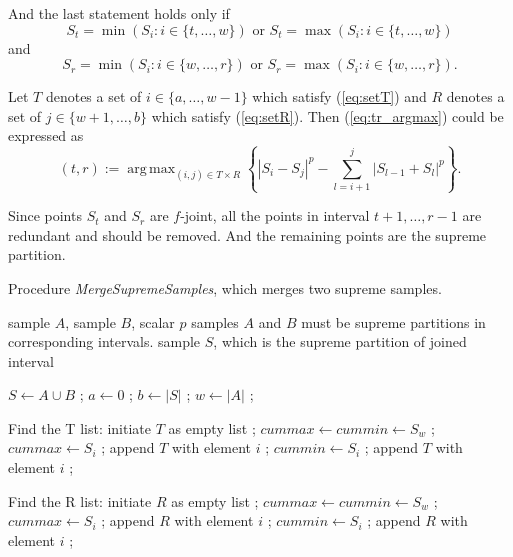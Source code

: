 \documentclass[12pt, a4paper]{article}
\DeclareMathOperator*{\argmax}{arg\,max}
\numberwithin{equation}{section}
\begin{document}
And the last statement holds only if 
\begin{equation}\label{eq:setT}
  S_t =  \min ( S_i : i \in \{t, \dots, w\}) 
    \text{ or } S_t =  \max ( S_i : i \in \{t, \dots, w\})
\end{equation}
and
\begin{equation}\label{eq:setR}
  S_r =  \min ( S_i : i \in \{w, \dots, r\}) 
    \text{ or } S_r = \max ( S_i : i \in \{w, \dots, r\}).
\end{equation} 


Let $T$ denotes a set of $i \in \{a,\dots ,w-1\}$ which satisfy 
(\ref{eq:setT}) and $R$ denotes a set of 
$j \in \{w+1,\dots ,b\}$ which satisfy (\ref{eq:setR}).
Then (\ref{eq:tr_argmax}) 
could be expressed as
\begin{equation}
  (t, r) :=  
    \argmax_{(i,j) \in T \times R }  
    \left\{|S_i-S_j|^p - \sum_{l=i+1}^j |S_{l-1} + S_{l}|^p  \right\}.   
\end{equation} 

Since points $S_t$ and $S_r$ are $f$-joint, all the 
points in interval $t+1,\dots, r-1$ are redundant
and should be removed. And the remaining points are
the supreme partition.


\begin{algorithm}[H]
\caption{Procedure \emph{MergeSupremeSamples}, 
which merges two
supreme samples. }
\label{alg:merge}
\begin{algorithmic}[1]
\Input sample $A$, sample $B$, scalar $p$
\Require samples $A$ and $B$ must be supreme partitions in corresponding intervals.
\Output sample $S$, which is the supreme partition of joined interval

\State $S \leftarrow A \cup  B$ ;   
\State $a \leftarrow 0$ ;     
\State $b \leftarrow |S|$ ;
\State $w \leftarrow |A|$ ;
\item[] \Comment Find the T list:
\State initiate $T$ as empty list ;
\State $cummax \leftarrow cummin \leftarrow S_w$ ;
    \State $cummax \leftarrow S_i$ ;
    \State append $T$ with element $i$ ;
  \EndIf
    \State $cummin \leftarrow S_i$ ;
	\State append $T$ with element $i$ ;
  \EndIf   
\EndFor
\item[] \Comment Find the R list:
\State initiate $R$ as empty list ;
\State $cummax \leftarrow cummin \leftarrow S_w$ ;
    \State $cummax \leftarrow S_i$ ;
    \State append $R$ with element $i$ ;
  \EndIf
    \State $cummin \leftarrow S_i$ ;
	\State append $R$ with element $i$ ;
  \EndIf   
\EndFor
{}
\end{algorithmic}
\end{algorithm}
\end{document}
